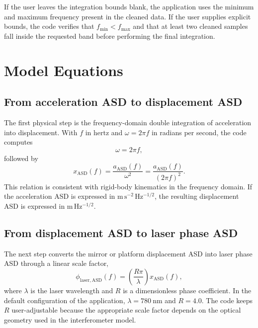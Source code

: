 \documentclass[11pt,a4paper]{report}
\begin{document}
If the user leaves the integration bounds blank, the application uses the minimum and maximum frequency present in the cleaned data. If the user supplies explicit bounds, the code verifies that $f_{\min} < f_{\max}$ and that at least two cleaned samples fall inside the requested band before performing the final integration.

\chapter{Model Equations}

\section{From acceleration ASD to displacement ASD}

The first physical step is the frequency-domain double integration of acceleration into displacement. With $f$ in hertz and $\omega = 2\pi f$ in radians per second, the code computes
\begin{equation}
\omega = 2\pi f,
\end{equation}
followed by
\begin{equation}
x_{\mathrm{ASD}}(f) = \frac{a_{\mathrm{ASD}}(f)}{\omega^2} = \frac{a_{\mathrm{ASD}}(f)}{(2\pi f)^2}.
\label{eq:displacement_asd}
\end{equation}
This relation is consistent with rigid-body kinematics in the frequency domain. If the acceleration ASD is expressed in $\mathrm{m\,s^{-2}\,Hz^{-1/2}}$, the resulting displacement ASD is expressed in $\mathrm{m\,Hz^{-1/2}}$.

\section{From displacement ASD to laser phase ASD}

The next step converts the mirror or platform displacement ASD into laser phase ASD through a linear scale factor,
\begin{equation}
\phi_{\mathrm{laser,ASD}}(f) = \left(\frac{R\pi}{\lambda}\right) x_{\mathrm{ASD}}(f),
\label{eq:laser_phase_asd}
\end{equation}
where $\lambda$ is the laser wavelength and $R$ is a dimensionless phase coefficient. In the default configuration of the application, $\lambda = 780~\mathrm{nm}$ and $R = 4.0$. The code keeps $R$ user-adjustable because the appropriate scale factor depends on the optical geometry used in the interferometer model.
\end{document}
